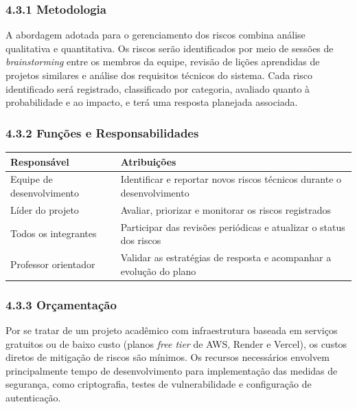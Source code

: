 \documentclass[12pt, a4paper]{article}
\begin{document}
\subsubsection*{4.3.1 Metodologia}
 
A abordagem adotada para o gerenciamento dos riscos combina an\'alise qualitativa e quantitativa.
Os riscos ser\~ao identificados por meio de sess\~oes de \textit{brainstorming} entre os membros
da equipe, revis\~ao de li\c{c}\~oes aprendidas de projetos similares e an\'alise dos requisitos
t\'ecnicos do sistema. Cada risco identificado ser\'a registrado, classificado por categoria,
avaliado quanto \`a probabilidade e ao impacto, e ter\'a uma resposta planejada associada.
 
\subsubsection*{4.3.2 Fun\c{c}\~oes e Responsabilidades}
 
\vspace{6pt}
\noindent
\renewcommand{\arraystretch}{1.4}
\begin{tabular}{|p{5cm}|p{9cm}|}
\hline
\textbf{Respons\'avel} & \textbf{Atribui\c{c}\~oes} \\
\hline
Equipe de desenvolvimento & Identificar e reportar novos riscos t\'ecnicos durante o desenvolvimento \\
\hline
L\'ider do projeto & Avaliar, priorizar e monitorar os riscos registrados \\
\hline
Todos os integrantes & Participar das revis\~oes peri\'odicas e atualizar o status dos riscos \\
\hline
Professor orientador & Validar as estrat\'egias de resposta e acompanhar a evolu\c{c}\~ao do plano \\
\hline
\end{tabular}
 
\subsubsection*{4.3.3 Or\c{c}amenta\c{c}\~ao}
 
Por se tratar de um projeto acad\^emico com infraestrutura baseada em servi\c{c}os gratuitos ou
de baixo custo (planos \textit{free tier} de AWS, Render e Vercel), os custos diretos de
mitiga\c{c}\~ao de riscos s\~ao m\'inimos. Os recursos necess\'arios envolvem principalmente
tempo de desenvolvimento para implementa\c{c}\~ao das medidas de seguran\c{c}a, como
criptografia, testes de vulnerabilidade e configura\c{c}\~ao de autentica\c{c}\~ao.
 
\end{document}
